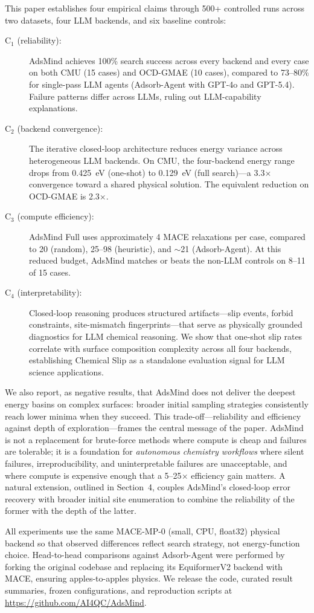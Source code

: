 This paper establishes four empirical claims through 500+ controlled runs across two datasets, four LLM backends, and six baseline controls:

\begin{description}
    \item[C$_1$ (reliability):] AdsMind achieves 100\% search success across every backend and every case on both CMU (15 cases) and OCD-GMAE (10 cases), compared to 73--80\% for single-pass LLM agents (Adsorb-Agent with GPT-4o and GPT-5.4). Failure patterns differ across LLMs, ruling out LLM-capability explanations.
    \item[C$_2$ (backend convergence):] The iterative closed-loop architecture reduces energy variance across heterogeneous LLM backends. On CMU, the four-backend energy range drops from 0.425~eV (one-shot) to 0.129~eV (full search)---a 3.3$\times$ convergence toward a shared physical solution. The equivalent reduction on OCD-GMAE is 2.3$\times$.
    \item[C$_3$ (compute efficiency):] AdsMind Full uses approximately 4 MACE relaxations per case, compared to 20 (random), 25--98 (heuristic), and $\sim$21 (Adsorb-Agent). At this reduced budget, AdsMind matches or beats the non-LLM controls on 8--11 of 15 cases.
    \item[C$_4$ (interpretability):] Closed-loop reasoning produces structured artifacts---slip events, forbid constraints, site-mismatch fingerprints---that serve as physically grounded diagnostics for LLM chemical reasoning. We show that one-shot slip rates correlate with surface composition complexity across all four backends, establishing Chemical Slip as a standalone evaluation signal for LLM science applications.
\end{description}

We also report, as negative results, that AdsMind does not deliver the deepest energy basins on complex surfaces: broader initial sampling strategies consistently reach lower minima when they succeed.
This trade-off---reliability and efficiency against depth of exploration---frames the central message of the paper.
AdsMind is not a replacement for brute-force methods where compute is cheap and failures are tolerable; it is a foundation for \textit{autonomous chemistry workflows} where silent failures, irreproducibility, and uninterpretable failures are unacceptable, and where compute is expensive enough that a 5--25$\times$ efficiency gain matters.
A natural extension, outlined in Section~4, couples AdsMind's closed-loop error recovery with broader initial site enumeration to combine the reliability of the former with the depth of the latter.

All experiments use the same MACE-MP-0 (small, CPU, float32) physical backend so that observed differences reflect search strategy, not energy-function choice.
Head-to-head comparisons against Adsorb-Agent were performed by forking the original codebase and replacing its EquiformerV2 backend with MACE, ensuring apples-to-apples physics.
We release the code, curated result summaries, frozen configurations, and reproduction scripts at \url{https://github.com/AI4QC/AdsMind}.
